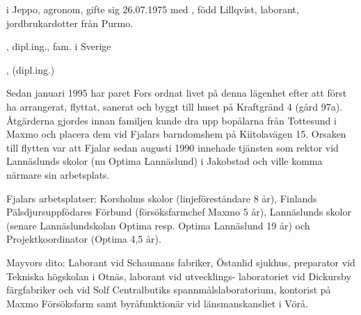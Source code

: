 


 i Jeppo, agronom, gifte sig 26.07.1975 med , född Lillqvist, laborant, jordbrukardotter från Purmo.

\begin{jhchildren}
  \item {}, dipl.ing., fam. i Sverige
  \item {}, (dipl.ing.)
\end{jhchildren}


Sedan januari 1995 har paret Fors ordnat livet på denna lägenhet efter att först ha arrangerat, flyttat, sanerat och byggt till huset på Kraftgränd 4 (gård 97a). Åtgärderna gjordes innan familjen kunde dra upp bopålarna från Tottesund i Maxmo och placera dem vid Fjalars barndomshem på Kiitolavägen 15. Orsaken till flytten var att Fjalar sedan augusti 1990 innehade tjänsten som rektor vid Lannäslunds skolor (nu Optima Lannäslund) i Jakobstad och ville komma närmare sin arbetsplats.

Fjalars arbetsplatser: Korsholms skolor (linjeföreståndare 8 år), Finlands Pälsdjursuppfödares Förbund (försöksfarmchef Maxmo 5 år), Lannäslunds skolor (senare Lannäslundskolan Optima resp. Optima Lannäslund 19 år) och Projektkoordinator (Optima 4,5 år).

Mayvors dito: Laborant vid Schaumans fabriker, Östanlid sjukhus, preparator vid Tekniska högskolan i Otnäs, laborant vid utvecklings- laboratoriet vid Dickursby färgfabriker och vid Solf Centralbutiks spannmålslaboratorium, kontorist på Maxmo Försöksfarm samt byråfunktionär vid länsmanskansliet i Vörå.

